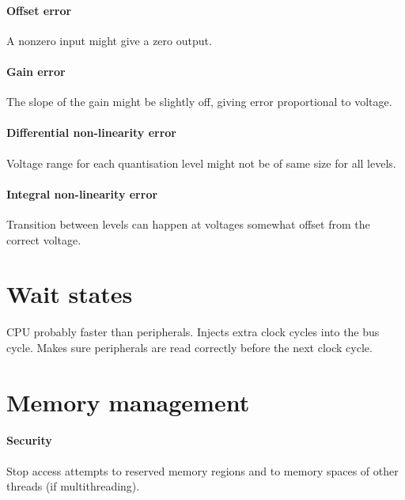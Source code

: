 \documentclass[a4paper, 12pt]{article}
\begin{document}
\paragraph{Offset error} A nonzero input might give a zero output.
\paragraph{Gain error} The slope of the gain might be slightly off, giving error proportional to voltage.
\paragraph{Differential non-linearity error} Voltage range for each quantisation level might not be of same size for all levels.
\paragraph{Integral non-linearity error} Transition between levels can happen at voltages somewhat offset from the correct voltage.



\section{Wait states}
CPU probably faster than peripherals. Injects extra clock cycles into the bus cycle. Makes sure peripherals are read correctly before the next clock cycle.



\section{Memory management}

\paragraph{Security} Stop access attempts to reserved memory regions and to memory spaces of other threads (if multithreading). 
\end{document}
